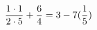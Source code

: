 \documentclass[preview]{standalone}
\begin{document}
\begin{align*}
\special{dvisvgm:raw <g id='unique000'>}\frac{1 \cdot 1}{2 \cdot 5} + \frac{6}{4} = 3 - 7(\frac{1}{5})\special{dvisvgm:raw </g>}
\end{align*}
\end{document}
